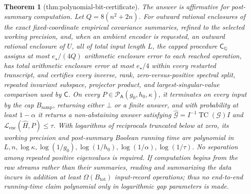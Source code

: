 \documentclass{article}
\newtheorem{theorem}{Theorem}
\begin{document}
\begin{theorem}[thm:polynomial-bit-certificate]\label{thm:polynomial-bit-certificate}
The answer is affirmative for post-summary computation.  Let \(Q=8(n^2+2n)\).  For outward rational enclosures of the exact fixed-coordinate empirical covariance summaries, refined to the selected working precision, and, when an ambient encoder is requested, an outward rational enclosure of \(U\), all of total input length \(L\), the capped procedure \(\mathsf C_{\mathbb Q}\) assigns at most \(e_{\star}/(4Q)\) arithmetic enclosure error to each reached operation, has total arithmetic enclosure error at most \(e_{\star}/4\) within every restarted transcript, and certifies every inverse, rank, zero-versus-positive spectral split, repeated invariant subspace, projector product, and largest-singular-value comparison used by \(\mathsf C\).  On every \(P\in\mathcal P_{\mathsf A}(g_0,h_0,\kappa)\), it terminates on every input by the cap \(B_{\mathrm{samp}}\), returning either \(\bot\) or a finite answer, and with probability at least \(1-\alpha\) it returns a non-abstaining answer satisfying \(\widehat{\mathcal G}=I^{-1}\operatorname{TC}(\mathcal G)I\) and \(\mathcal L_{\mathrm{enc}}(\widehat H,P)\le\tau\).  With logarithms of reciprocals truncated below at zero, its working precision and post-summary Boolean running time are polynomial in \(L,n,\log\kappa,\log(1/g_0),\log(1/h_0),\log(1/\alpha),\log(1/\tau)\).  No separation among repeated positive eigenvalues is required.  If computation begins from the raw streams rather than their summaries, reading and summarizing the data incurs in addition at least \(\Omega(B_{\mathrm{tot}})\) input-record operations; thus no end-to-end running-time claim polynomial only in logarithmic gap parameters is made.
\end{theorem}
\end{document}
